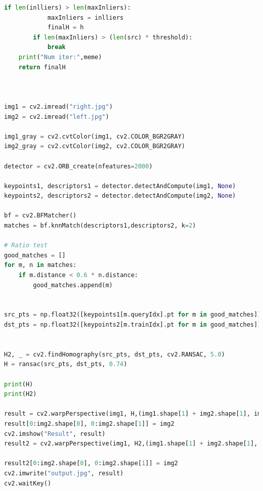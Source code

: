 \documentclass{article}
\begin{document}
\begin{appendices}
\begin{lstlisting}[language=python]
        if len(inlliers) > len(maxInliers):
            maxInliers = inlliers
            finalH = h
        if len(maxInliers) > (len(src) * threshold):
            break
    print("Num iter:",meme)
    return finalH



img1 = cv2.imread("right.jpg")
img2 = cv2.imread("left.jpg")

img1_gray = cv2.cvtColor(img1, cv2.COLOR_BGR2GRAY)
img2_gray = cv2.cvtColor(img2, cv2.COLOR_BGR2GRAY)

detector = cv2.ORB_create(nfeatures=2000)

keypoints1, descriptors1 = detector.detectAndCompute(img1, None)
keypoints2, descriptors2 = detector.detectAndCompute(img2, None)

bf = cv2.BFMatcher()
matches = bf.knnMatch(descriptors1,descriptors2, k=2)

# Ratio test
good_matches = []
for m, n in matches:
    if m.distance < 0.6 * n.distance:
        good_matches.append(m)


src_pts = np.float32([keypoints1[m.queryIdx].pt for m in good_matches]).reshape(-1, 1, 2)
dst_pts = np.float32([keypoints2[m.trainIdx].pt for m in good_matches]).reshape(-1, 1, 2)


H2, _ = cv2.findHomography(src_pts, dst_pts, cv2.RANSAC, 5.0)
H = ransac(src_pts, dst_pts, 0.74)

print(H)
print(H2)

result = cv2.warpPerspective(img1, H,(img1.shape[1] + img2.shape[1], img1.shape[0]))
result[0:img2.shape[0], 0:img2.shape[1]] = img2
cv2.imshow("Result", result)
result2 = cv2.warpPerspective(img1, H2,(img1.shape[1] + img2.shape[1], img1.shape[0]))

result2[0:img2.shape[0], 0:img2.shape[1]] = img2
cv2.imwrite("output.jpg", result)
cv2.waitKey()
        \end{lstlisting}
    \end{appendices}
\end{document}
